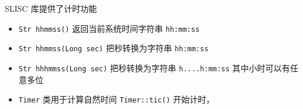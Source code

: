 

SLISC 库提供了计时功能

\begin{itemize}
\item \verb|Str hhmmss()| 返回当前系统时间字符串 \verb|hh:mm:ss|
\item \verb|Str hhmmss(Long sec)| 把秒转换为字符串 \verb|hh:mm:ss|
\item \verb|Str hhhmmss(Long sec)| 把秒转换为字符串 \verb|h....h:mm:ss| 其中小时可以有任意多位
\item \verb|Timer| 类用于计算自然时间 \verb|Timer::tic()| 开始计时， \ve
\end{itemize}
